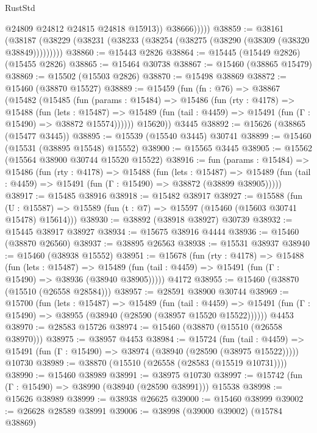 \begin{lexlean}{RustStd}
\begin{coremodule}
                  @24809
                  @24812
                  @24815
                  @24818
                  @15913))
              @38666)))))
@38859 := @38161
    (@38187 (@38229 (@38231 (@38233 (@38254 (@38275 (@38290 (@38309 (@38320 @38849)))))))))
@38860 := @15443 @2826
@38864 := @15445 (@15449 @2826) (@15455 @2826)
@38865 := @15464 @30738
@38867 := @15460 (@38865 @15479)
@38869 := @15502 (@15503 @2826)
@38870 := @15498 @38869
@38872 := @15460 (@38870 @15527)
@38889 := @15459
    (fun (fn : @76) =>
    @38867
      (@15482
        (@15485
          (fun (params : @15484) =>
          @15486
            (fun (rty : @4178) =>
            @15488
              (fun (lets : @15487) =>
              @15489 (fun (tail : @4459) => @15491 (fun (Γ : @15490) => @38872 @15574))))))
        @15620))
    @3445
@38892 := @15626 (@38865 (@15477 @3445))
@38895 := @15539 (@15540 @3445) @30741
@38899 := @15460 (@15531 (@38895 @15548) @15552)
@38900 := @15565 @3445
@38905 := @15562 (@15564 @38900 @30744 @15520 @15522)
@38916 := fun (params : @15484) =>
  @15486
    (fun (rty : @4178) =>
    @15488
      (fun (lets : @15487) =>
      @15489 (fun (tail : @4459) => @15491 (fun (Γ : @15490) => @38872 (@38899 @38905)))))
@38917 := @15485 @38916
@38918 := @15482 @38917
@38927 := @15588
    (fun (U : @15587) => @15589 (fun (t : @7) => @15597 (@15460 (@15603 @30741 @15478) @15614)))
@38930 := @38892 (@38918 @38927) @30739
@38932 := @15445 @38917 @38927
@38934 := @15675 @38916 @4444
@38936 := @15460 (@38870 @26560)
@38937 := @38895 @26563
@38938 := @15531 @38937
@38940 := @15460 (@38938 @15552)
@38951 := @15678
    (fun (rty : @4178) =>
    @15488
      (fun (lets : @15487) =>
      @15489 (fun (tail : @4459) => @15491 (fun (Γ : @15490) => @38936 (@38940 @38905)))))
    @4172
@38955 := @15460 (@38870 (@15510 (@26558 @28584)))
@38957 := @28591 @38900 @30744
@38969 := @15700
    (fun (lets : @15487) =>
    @15489
      (fun (tail : @4459) =>
      @15491 (fun (Γ : @15490) => @38955 (@38940 (@28590 (@38957 @15520 @15522))))))
    @4453
@38970 := @28583 @15726
@38974 := @15460 (@38870 (@15510 (@26558 @38970)))
@38975 := @38957 @4453
@38984 := @15724
    (fun (tail : @4459) => @15491 (fun (Γ : @15490) => @38974 (@38940 (@28590 (@38975 @15522)))))
    @10730
@38989 := @38870 (@15510 (@26558 (@28583 (@15519 @10731))))
@38990 := @15460 @38989
@38991 := @38975 @10730
@38997 := @15742 (fun (Γ : @15490) => @38990 (@38940 (@28590 @38991))) @15538
@38998 := @15626 @38989
@38999 := @38938 @26625
@39000 := @15460 @38999
@39002 := @26628 @28589 @38991
@39006 := @38998 (@39000 @39002) (@15784 @38869)

\end{coremodule}
\end{lexlean}
